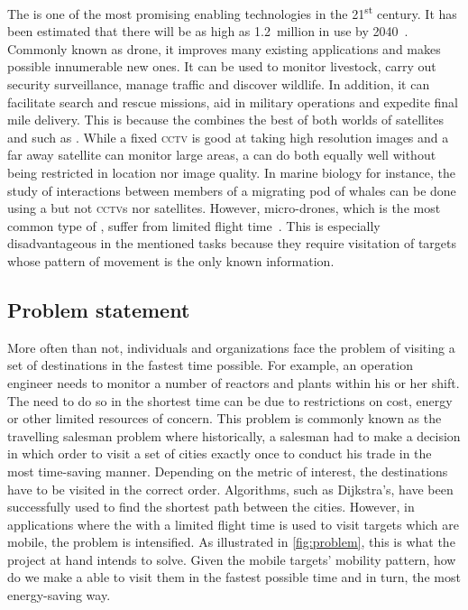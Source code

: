 \documentclass[../main.tex]{subfiles}
\begin{document}
The \uav is one of the most promising enabling technologies in the 
21\textsuperscript{st} century. It has been estimated that
there will be as high as \SI{1.2}{million} \uavs in use 
by 2040~\cite{Amo19}. 
Commonly known as drone, 
it improves many existing applications and makes possible 
innumerable new ones. It can be used to monitor livestock, 
carry out security surveillance, manage traffic 
and discover wildlife.
In addition, it can facilitate search and rescue missions,
aid in military operations and expedite final mile delivery.
This is because the \uav combines the best of both worlds
of satellites and \csns such as \cctvs.
While a fixed \textsc{cctv} is good at taking 
high resolution images and a far away satellite can monitor
large areas, a \uav can do both equally well without 
being restricted in location nor image quality. 
In marine biology for instance,  
the study of interactions between members of a migrating 
pod of whales can be done using a \uav but not 
\textsc{cctv}s nor satellites.
However, micro-drones, which is the most common type of \uavs,
suffer from limited flight time~\cite{Sha19}. 
This is especially disadvantageous in
the mentioned tasks because they require visitation of targets
whose pattern of movement is the only known information.

\subsection{Problem statement}

More often than not, individuals and organizations face the problem
of visiting a set of destinations in the fastest time 
possible.
For example, an operation engineer needs to monitor
a number of reactors and plants within his or her shift.
The need to do so in the shortest time can be due to restrictions on
cost, energy or other limited resources of concern.
This problem is commonly known as the travelling salesman problem
where historically, a salesman had to make a decision in which order
to visit a set of cities exactly once to conduct his trade
in the most time-saving manner.
Depending on the metric of interest, 
the destinations have to be visited in the correct order.
Algorithms, such as Dijkstra's, have been successfully used 
to find the shortest path between the cities.
However, in applications where the \uav with a limited
flight time is used to 
visit targets which are mobile, the problem is intensified.
As illustrated in \cref{fig:problem}, this
is what the project at hand intends to solve.
Given the mobile targets' mobility pattern,
how do we make a \uav able to visit them
in the fastest possible time and in turn, 
the most energy-saving way.  
\end{document}

